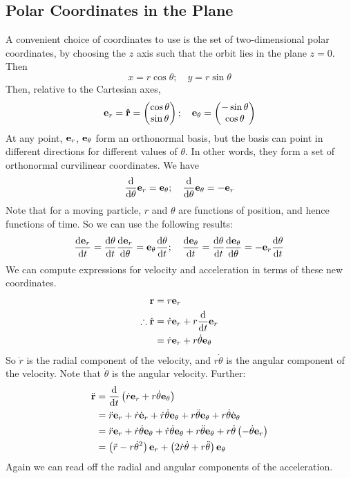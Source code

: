 \subsection{Polar Coordinates in the Plane}
A convenient choice of coordinates to use is the set of two-dimensional polar coordinates, by choosing the \(z\) axis such that the orbit lies in the plane \(z=0\).
Then
\[
	x = r\cos\theta;\quad y = r\sin\theta
\]
Then, relative to the Cartesian axes,
\[
	\vb e_r = \vu{r} = \begin{pmatrix}
		\cos\theta \\ \sin\theta
	\end{pmatrix};\quad \vb e_\theta = \begin{pmatrix}
		-\sin\theta \\ \cos\theta
	\end{pmatrix}
\]
At any point, \(\vb e_r\), \(\vb e_\theta\) form an orthonormal basis, but the basis can point in different directions for different values of \(\theta\).
In other words, they form a set of orthonormal curvilinear coordinates.
We have
\[
	\frac{\dd}{\dd{\theta}}\vb e_r = \vb e_\theta;\quad \frac{\dd}{\dd{\theta}}\vb e_\theta = -\vb e_r
\]
Note that for a moving particle, \(r\) and \(\theta\) are functions of position, and hence functions of time.
So we can use the following results:
\[
	\frac{\dd \vb e_r}{\dd{t}} = \frac{\dd{\theta}}{\dd{t}} \frac{\dd \vb e_r}{\dd{\theta}} = \vb e_\theta \frac{\dd{\theta}}{\dd{t}};\quad \frac{\dd \vb e_\theta}{\dd{t}} = \frac{\dd{\theta}}{\dd{t}} \frac{\dd \vb e_\theta}{\dd{\theta}} = -\vb e_r \frac{\dd{\theta}}{\dd{t}}
\]
We can compute expressions for velocity and acceleration in terms of these new coordinates.
\begin{align*}
	\vb r                  & = r \vb e_r                                    \\
	\therefore \dot{\vb r} & = \dot r \vb e_r + r \frac{\dd}{\dd{t}}\vb e_r \\
	                       & = \dot r \vb e_r + r \dot\theta \vb e_\theta
\end{align*}
So \(\dot r\) is the radial component of the velocity, and \(r\dot\theta\) is the angular component of the velocity.
Note that \(\dot\theta\) is the angular velocity.
Further:
\begin{align*}
	\ddot{\vb r} & = \frac{\dd}{\dd{t}}\left( \dot r \vb e_r + r \dot \theta \vb e_\theta \right)                                                                                        \\
	             & = \ddot r \vb e_r + \dot r \dot{\vb e}_r + \dot r \dot \theta \vb e_\theta + r \ddot \theta \vb e_\theta + r \dot \theta \dot{\vb e}_\theta                           \\
	             & = \ddot r \vb e_r + \dot r \dot \theta \vb e_\theta + \dot r \dot \theta \vb e_\theta + r \ddot \theta \vb e_\theta + r \dot \theta \left(-\dot \theta \vb e_r\right) \\
	             & = \left(\ddot r - r \dot \theta^2\right) \vb e_r + \left(2\dot r\dot \theta + r\ddot \theta\right) \vb e_\theta
\end{align*}
Again we can read off the radial and angular components of the acceleration.

